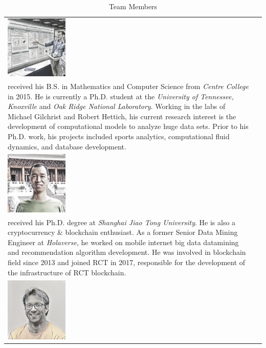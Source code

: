 \documentclass[a4paper,oneside,openany]{tufte-book}
\begin{document}
\begin{table}[ht]
\centering
\caption{Team Members}
\label{tab_teamMembers}
\begin{tabular}{ l | l }
     \includegraphics[width=30mm]{fig/p2} & \begin{minipage}{40em}
  \emph{Alexander Cope} \\ received his B.S. in Mathematics and Computer Science from \emph{Centre College} in 2015. He is currently a Ph.D. student at the \emph{University of Tennessee, Knoxville} and \emph{Oak Ridge National Laboratory}. Working in the labs of Michael Gilchrist and Robert Hettich, his current research interest is the development of computational models to analyze huge data sets. Prior to his Ph.D. work, his projects included sports analytics, computational fluid dynamics, and database development.
\end{minipage}\\
     \includegraphics[width=30mm]{fig/p4} &\begin{minipage}{40em}
  \emph{Jason Lian} \\ received his Ph.D. degree at \emph{Shanghai Jiao Tong University}. He is also a cryptocurrency \& blockchain enthusiast. As a former Senior Data Mining Engineer at \emph{Holaverse}, he worked on mobile internet big data datamining and recommendation algorithm development. He was involved in blockchain field since 2013 and joined RCT in 2017, responsible for the development of the infrastructure of RCT blockchain.
\end{minipage} \\
      \includegraphics[width=30mm]{fig/p3}     &\begin{minipage}{40em}

\end{minipage}
\end{tabular}
\end{table}
\end{document}
